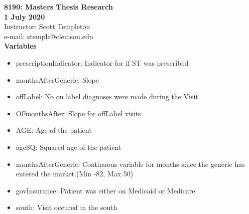 
\let\counterwithout\relax
\let\counterwithin\relax
{}



\noindent \textbf{8190: Masters Thesis Research}\\
\noindent \textbf{1 July 2020}\\
\noindent Instructor: Scott Templeton \\
e-mail: stemple@clemson.edu\\

\noindent \textbf{Variables}\\
\begin{itemize}
    \item prescriptionIndicator: Indicator for if ST was prescribed
    \item monthsAfterGeneric: Slope
    \item offLabel: No on label diagnoses were made during the Visit
    \item OFmonthsAfter: Slope for offLabel visits
    \item AGE: Age of the patient
    \item ageSQ: Squared age of the patient
    \item monthsAfterGeneric: Continuous variable for months since the generic has entered the market.(Min -82, Max 50)
    \item govInsurance: Patient was either on Medicaid or Medicare
    \item south: Visit occured in the south
\end{itemize}
\begin{landscape}

\end{landscape}




